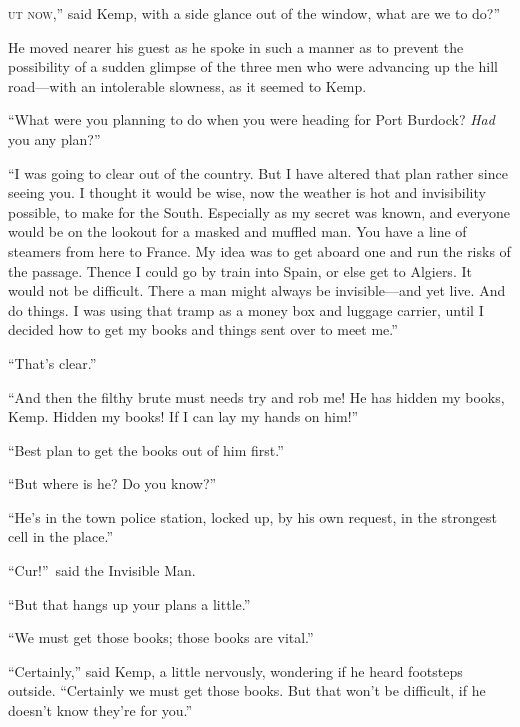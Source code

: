 \label{ch:24}
\begin{ChapterStart}
\vspace*{2\nbs}

\vspace{1.5\nbs}
\end{ChapterStart}

\kern-5pt\textsc{ut now},” said Kemp, with a side glance out of the window, what are we to do?”

He moved nearer his guest as he spoke in such a manner as to prevent the possibility of a sudden glimpse of the three men who were advancing up the hill road—with an intolerable slowness, as it seemed to Kemp.

“What were you planning to do when you were heading for Port Burdock? \emph{Had} you any plan?”

“I was going to clear out of the country. But I have altered that plan rather since seeing you. I thought it would be wise, now the weather is hot and invisibility possible, to make for the South. Especially as my secret was known, and everyone would be on the lookout for a masked and muffled man. You have a line of steamers from here to France. My idea was to get aboard one and run the risks of the passage. Thence I could go by train into Spain, or else get to Algiers. It would not be difficult. There a man might always be invisible—and yet live. And do things. I was using that tramp as a money box and luggage carrier, until I decided how to get my books and things sent over to meet me.”

“That’s clear.”

“And then the filthy brute must needs try and rob me! He has hidden my books, Kemp. Hidden my books! If I can lay my hands on him!”

“Best plan to get the books out of him first.”

“But where is he? Do you know?”

“He’s in the town police station, locked up, by his own request, in the strongest cell in the place.”

“Cur!”\ said the Invisible Man.

“But that hangs up your plans a little.”

“We must get those books; those books are vital.”

“Certainly,” said Kemp, a little nervously, wondering if he heard footsteps outside. “Certainly we must get those books. But that won’t be difficult, if he doesn’t know they’re for you.”

